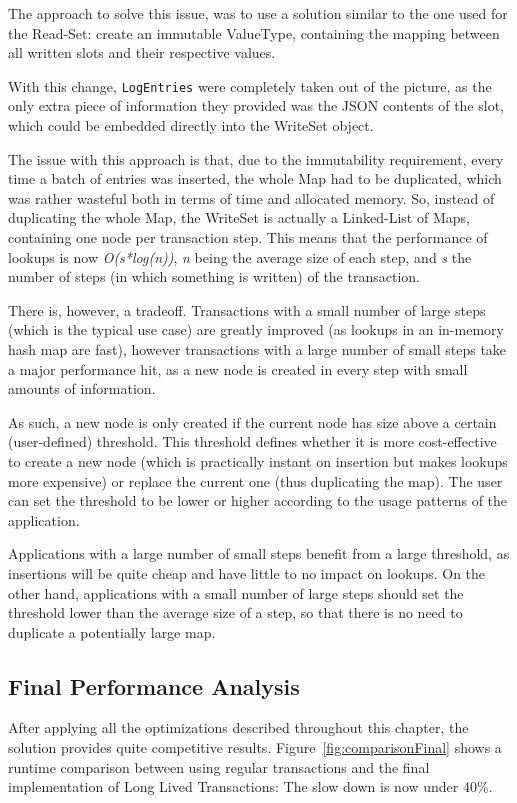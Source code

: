 \documentclass{llncs}
\begin{document}
The approach to solve this issue, was to use a solution similar to the
one used for the Read-Set: create an immutable ValueType, containing
the mapping between all written slots and their respective values.

With this change, \texttt{LogEntries} were completely taken out of the
picture, as the only extra piece of information they provided was the
JSON contents of the slot, which could be embedded directly into the
WriteSet object.

The issue with this approach is that, due to the immutability
requirement, every time a batch of entries was inserted, the whole Map
had to be duplicated, which was rather wasteful both in terms of time
and allocated memory. So, instead of duplicating the whole Map, the
WriteSet is actually a Linked-List of Maps, containing one node per
transaction step. This means that the performance of lookups is now
{\it O(s*log(n))}, {\it n} being the average size of each step, and
{\it s} the number of steps (in which something is written) of the
transaction.

There is, however, a tradeoff. Transactions with a small number of large
steps (which is the typical use case) are greatly improved (as lookups
in an in-memory hash map are fast), however transactions with a large
number of small steps take a major performance hit, as a new node is
created in every step with small amounts of information.

As such, a new node is only created if the current node has size above
a certain (user-defined) threshold. This threshold defines whether it
is more cost-effective to create a new node (which is practically
instant on insertion but makes lookups more expensive) or replace the
current one (thus duplicating the map). The user can set the threshold
to be lower or higher according to the usage patterns of the
application.

Applications with a large number of small steps benefit from a large
threshold, as insertions will be quite cheap and have little to no
impact on lookups. On the other hand, applications with a small number
of large steps should set the threshold lower than the average size of
a step, so that there is no need to duplicate a potentially large map.

\subsection{Final Performance Analysis}

After applying all the optimizations described throughout this
chapter, the solution provides quite competitive
results. Figure~\ref{fig:comparisonFinal} shows a runtime comparison
between using regular transactions and the final implementation of
Long Lived Transactions: The slow down is now under 40\%.
\end{document}
